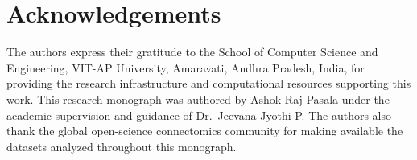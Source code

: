 \documentclass[11pt,letterpaper]{report}
\begin{document}
\section*{Acknowledgements}
The authors express their gratitude to the School of Computer Science and Engineering, VIT-AP University, Amaravati, Andhra Pradesh, India, for providing the research infrastructure and computational resources supporting this work. This research monograph was authored by Ashok Raj Pasala under the academic supervision and guidance of Dr.~Jeevana Jyothi P. The authors also thank the global open-science connectomics community for making available the datasets analyzed throughout this monograph.



\end{document}
